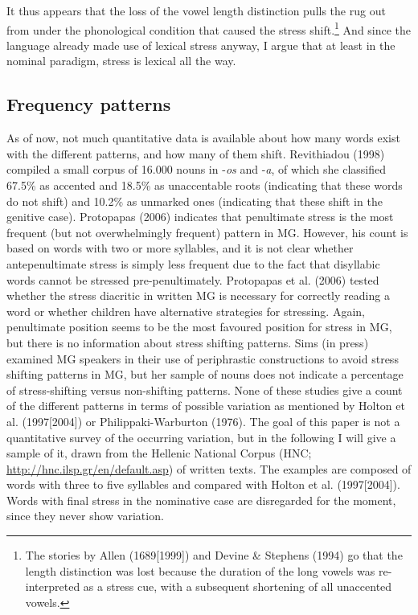 \documentclass[a4paper]{article}
\begin{document}
It thus appears that the loss of the vowel length distinction pulls the rug out from under the phonological condition that caused the stress shift.\footnote{ The stories by Allen (1689[1999]) and Devine \& Stephens (1994) go that the length distinction was lost because the duration of the long vowels was re-interpreted as a stress cue, with a subsequent shortening of all unaccented vowels.} And since the language already made use of lexical stress anyway, I argue that at least in the nominal paradigm, stress is lexical all the way.


\subsection{
Frequency patterns}


As of now, not much quantitative data is available about how many words exist with the different patterns, and how many of them shift. Revithiadou (1998) compiled a small corpus of 16.000 nouns in -\textit{os} and -\textit{a}, of which she classified 67.5\% as accented and 18.5\% as unaccentable roots (indicating that these words do not shift) and 10.2\% as unmarked ones (indicating that these shift in the genitive case). Protopapas (2006) indicates that penultimate stress is the most frequent (but not overwhelmingly frequent) pattern in MG. However, his count is based on words with two or more syllables, and it is not clear whether antepenultimate stress is simply less frequent  due to the fact that disyllabic words cannot be stressed pre-penultimately. Protopapas et al. (2006) tested whether the stress diacritic in written MG is necessary for correctly reading a word or whether children have alternative strategies for stressing. Again, penultimate position seems to be the most favoured position for stress in MG, but there is no information about stress shifting patterns. Sims (in press) examined MG speakers in their use of periphrastic constructions to avoid stress shifting patterns in MG, but her sample of nouns does not indicate a percentage of stress-shifting versus non-shifting patterns. None of these studies give a count of the different patterns in terms of possible variation as mentioned by Holton et al. (1997[2004]) or Philippaki-Warburton (1976). The goal of this paper is not a quantitative survey of the occurring variation, but in the following I will give a sample of it, drawn from the Hellenic National Corpus (HNC; \url{http://hnc.ilsp.gr/en/default.asp}) of written texts. The examples are composed of words with three to five syllables and compared with Holton et al. (1997[2004]). Words with final stress in the nominative case are disregarded for the moment, since they never show variation.
\end{document}

